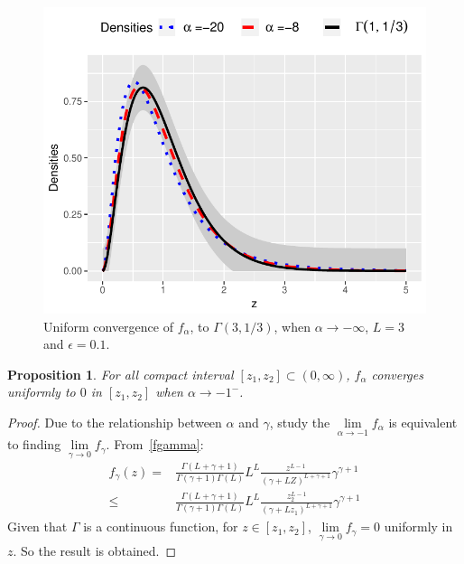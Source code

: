 \documentclass[technote,onecolumn,draftcls,12pt]{IEEEtran}
\newtheorem{proposition}{Proposition}
\numberwithin{equation}{section}
\newenvironment{dem}[1][Proof]{\begin{proof}[{\it #1}]}{\end{proof}}
\newcommand{\pa}[1]{\ensuremath{\left( #1 \right)}}
\begin{document}
\begin{figure}[hbt]
	\centering    
	\includegraphics[width=\linewidth]{../../../Figures/DTTeorico/ConvUniformeMenosInfinito2.pdf}
	\caption{\label{ConvInfinito}Uniform convergence of $f_{\alpha}$, to $\Gamma(3,1/3)$, when $\alpha \to -\infty$, $L=3$ and $\epsilon=0.1$.}
\end{figure} 

\begin{proposition}
	For all compact interval $[z_{1},z_{2}]\subset\pa{0,\infty}$, $f_{\alpha}$ converges uniformly to $0$ in $[z_{1},z_{2}]$ when $\alpha\to -1^{-}$.
	\label{pr: convergenciauniforme2}
\end{proposition}

\begin{dem} 
	Due to the relationship between $\alpha$ and $\gamma$, study the $\lim\limits_{\alpha\to-1} f_{\alpha}$ is equivalent to finding
	$\lim\limits_{\gamma\to0} f_{\gamma}.$
	From~\eqref{fgamma}:
	\begin{align*}
	 f_{\gamma}\pa{z} = &\frac{\Gamma\pa{L+\gamma+1}}{\Gamma\pa{\gamma+1}\Gamma\pa{L}}
	L^{L} \frac{z^{L-1}}{(\gamma+LZ)^{L+\gamma+1}} \gamma^{\gamma +1}  \\
	\leq& \frac{\Gamma\pa{L+\gamma+1}}{\Gamma\pa{\gamma+1}\Gamma\pa{L}}
	L^{L} \frac{z_2^{L-1}}{(\gamma+Lz_1)^{L+\gamma+1}} \gamma^{\gamma +1} 
	\end{align*}
	Given that $\Gamma$ is a continuous function, for $z \in [z_{1},z_{2}]$, $\lim\limits_{\gamma\to0} f_{\gamma}=0$ uniformly in $z$. So the result is obtained.
\end{dem}
\end{document}
